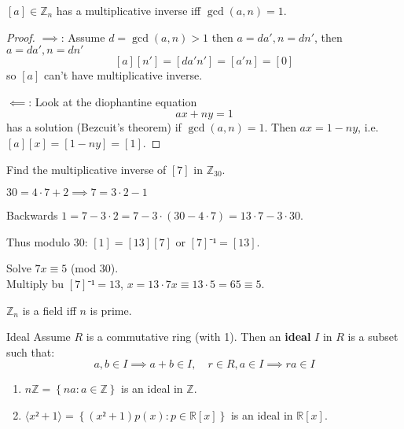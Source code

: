 \documentclass[english]{lbscript}
\begin{document}
\begin{theorem}{}{}
  \([a]∈ℤ_{n}\) has a multiplicative inverse iff \(\gcd(a, n)=1\).
\end{theorem}
\begin{proof}
  \(⟹\): Assume \(d=\gcd(a,n)>1\) then \(a=da', n=dn'\), then \(a=da', n=dn'\)
  \begin{equation}
    \label{eq:105}
    [a][n']=[da'n']=[a'n]=[0]
  \end{equation}
  so \([a]\) can't have  multiplicative inverse.

  \(\impliedby\): Look at the diophantine equation
  \begin{equation}
    \label{eq:106}
    ax+ny=1
  \end{equation}
  has a solution (Bezcuit's theorem) if \(\gcd(a,n)=1\). Then \(ax=1-ny\), i.e. \([a][x]=[1-ny]=[1]\).
\end{proof}

\begin{example}{}{}
  Find the multiplicative inverse of \([7]\) in \(ℤ_{30}\).

  \(30=4⋅7+2⟹7=3⋅2-1\)

  Backwards \(1=7-3⋅2=7- 3⋅(30-4⋅7)=13⋅7 - 3⋅30\).

  Thus modulo 30: \([1]=[13][7]\) or \([7]⁻¹=[13]\).
\end{example}
\begin{example}{}{}
  Solve \(7x≡5\) (mod 30).\\
  Multiply bu \([7]⁻¹=13\), \(x=13⋅7x≡13⋅5=65≡5\).
\end{example}

\begin{corollary}{}{}
  \(ℤ_{n}\) is a field iff \(n\) is prime.
\end{corollary}

\begin{definition}{Ideal}{}
  Assume \(R\) is a commutative ring (with 1).
  Then an \textbf{ideal} \(I\) in \(R\) is a subset such that:
  \begin{equation}
    \label{eq:107}
    a,b∈I⟹a+b∈I, \quad r∈R,a∈I⟹ra∈I
  \end{equation}
\end{definition}
\begin{example}{}{}
  \begin{enumerate}
    \item\label{item:56} \(nℤ=\left\{ na: a∈ℤ \right\} \) is an ideal in \(ℤ\).
    \item\label{item:57} \(⟨x²+1⟩=\left\{ (x²+1)p(x): p∈ℝ[x] \right\} \) is an ideal in \(ℝ[x]\).
  \end{enumerate}
\end{example}
\end{document}
